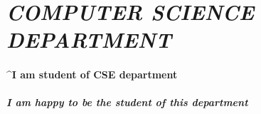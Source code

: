\documentclass{article}
\begin{document}
\section{\textit{COMPUTER SCIENCE DEPARTMENT}}
\paragraph{\textasciicircum I am student of CSE department}
\subparagraph{\textsf{I am happy to be the student of this department}}
\end{document}
